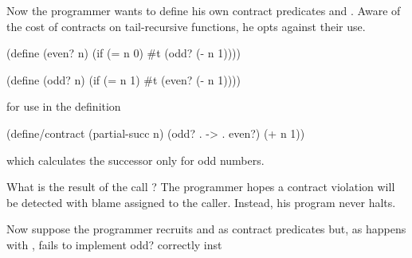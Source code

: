 \documentclass{sigplanconf}
\begin{document}
Now the programmer wants to define his own contract predicates  and . Aware of the cost of contracts on tail-recursive functions, he opts against their use.
\begin{schemedisplay}
(define (even? n)
  (if (= n 0)
      #t
      (odd? (- n 1))))
      
(define (odd? n)
  (if (= n 1)
      #t
      (even? (- n 1))))
\end{schemedisplay}
for use in the definition
\begin{schemedisplay}
(define/contract (partial-succ n)
  (odd? . -> . even?)
  (+ n 1))
\end{schemedisplay}
which calculates the successor only for odd numbers.

What is the result of the call ?
The programmer hopes a contract violation will be detected with blame assigned to the caller.
Instead, his program never halts.

Now suppose the programmer recruits  and  as contract predicates but, as happens with , fails to implement odd? correctly inst









\end{document}
